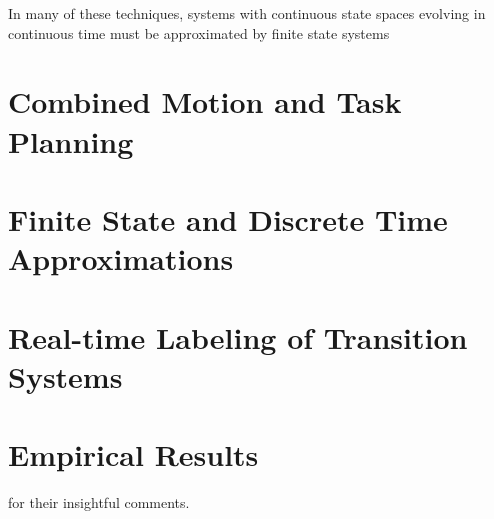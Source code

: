 \documentclass{llncs}
\begin{document}
In many of these techniques, systems with continuous state spaces evolving in continuous time must be approximated by finite state systems   

\section{\label{sec:background}Combined Motion and Task Planning}
\section{\label{sec:approach}Finite State and Discrete Time Approximations}
\section{\label{sec:Approach}Real-time Labeling of Transition Systems}
\section{\label{sec:experiments}Empirical Results}


for their insightful comments. 


\end{document}
